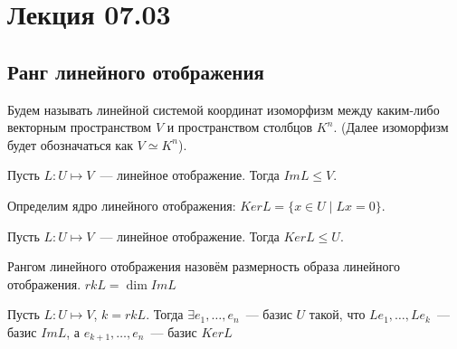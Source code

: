 \section{Лекция 07.03}
\subsection{Ранг линейного отображения}
\begin{definition}
    Будем называть линейной системой координат изоморфизм между каким-либо векторным пространством
    $V$ и пространством столбцов $K^n$. (Далее изоморфизм будет обозначаться как $V \simeq K^n$).
\end{definition}
\begin{remark}
    Пусть $L: U\mapsto V$~--- линейное отображение. 
    Тогда $Im L \leq V$.
\end{remark}
\begin{definition}
    Определим ядро линейного отображения: $Ker L = \{x\in U \mid Lx = 0\}$. 
\end{definition}
\begin{remark}
    Пусть $L: U\mapsto V$~--- линейное отображение. 
    Тогда $Ker L \leq U$.
\end{remark}
\begin{definition}
    Рангом линейного отображения назовём размерность образа линейного отображения.
    $rk L = \dim Im L$
\end{definition}
\begin{theorem}
    Пусть $L: U\mapsto V$, $k = rk L$. 
    Тогда $\exists e_1,\dots,e_n$~--- базис $U$ такой, что
    $Le_1,\dots, Le_k$~--- базис $Im L$, а $e_{k+1},\dots,e_{n}$~--- базис $Ker L$
\end{theorem}
